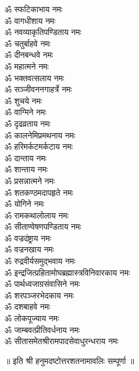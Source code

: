 \begin{multicols}{2}
\begin{flushleft}
ॐ स्फटिकाभाय नमः\\
ॐ वागधीशाय नमः\hfill{}\\
ॐ नवव्याकृतिपण्डिताय नमः\\
ॐ चतुर्बाहवे नमः\\
ॐ दीनबन्धवे नमः\\
ॐ महात्मने नमः\\
ॐ भक्तवत्सलाय नमः\\
ॐ सञ्जीवननगाहर्त्रे नमः\\
ॐ शुचये नमः\\
ॐ वाग्मिने नमः\\
ॐ दृढव्रताय नमः\\
ॐ कालनेमिप्रमथनाय नमः\hfill{}\\
ॐ हरिमर्कटमर्कटाय नमः\\
ॐ दान्ताय नमः\\
ॐ शान्ताय नमः\\
ॐ प्रसन्नात्मने नमः\\
ॐ शतकण्ठमदापहृते नमः\\
ॐ योगिने नमः\\
ॐ रामकथालोलाय नमः\\
ॐ सीताण्वेषणपण्डिताय नमः\\
ॐ वज्रदंष्ट्राय नमः\\
ॐ वज्रनखाय नमः\hfill{}\\
ॐ रुद्रवीर्यसमुद्भवाय नमः\\
ॐ इन्द्रजित्प्रहितामोघ\-ब्रह्मास्त्रविनिवारकाय नमः\\
ॐ पार्थध्वजाग्रसंवासिने नमः\\
ॐ शरपञ्जरभेदकाय नमः\\
ॐ दशबाहवे नमः\\
ॐ लोकपूज्याय नमः\\
ॐ जाम्बवत्प्रीतिवर्धनाय नमः\\
ॐ सीतासमेतश्रीराम\-पादसेवाधुरन्धराय नमः\\
\end{flushleft}
\end{multicols}
\centerline{॥ इति श्री हनुमदष्टोत्तरशतनामावलिः सम्पूर्णा ॥}
